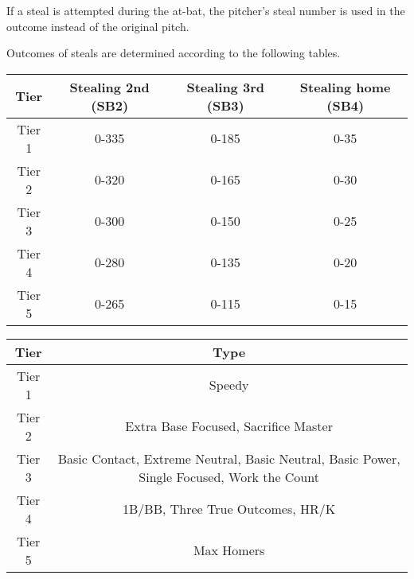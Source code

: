 \begin{deepEnumerate}
\begin{deepEnumerate}
\begin{deepEnumerate}
			If a steal is attempted during the at-bat, the pitcher's steal number is used in the outcome instead of the original pitch. 
		\end{deepEnumerate}
		\item Outcomes of steals are determined according to the following tables.
		\begin{center}
			\begin{tabular}{|c|c|c|c|}
				\hline
				\textbf{Tier} & \textbf{Stealing 2nd} (SB2)    & \textbf{Stealing 3rd} (SB3)    & \textbf{Stealing home} (SB4) \\
				\hline 
				Tier 1   	  & 0-335                          & 0-185                          & 0-35                         \\
				\hline
				Tier 2    	  & 0-320                          & 0-165                          & 0-30                         \\
				\hline
				Tier 3   	  & 0-300                          & 0-150                          & 0-25                         \\
				\hline
				Tier 4   	  & 0-280                          & 0-135                          & 0-20                         \\
				\hline
				Tier 5   	  & 0-265                          & 0-115                          & 0-15                         \\
				\hline
			\end{tabular}
			\begin{tabular}{|c|c|}
				\hline
				\textbf{Tier} & \textbf{Type}                                           		\\
				\hline 
				Tier 1   	 & Speedy \\
				\hline
				Tier 2    	 & Extra Base Focused, Sacrifice Master\\
				\hline
				Tier 3   	 &Basic Contact, Extreme Neutral, Basic Neutral, Basic Power, Single Focused, Work the Count \\
				\hline
				Tier 4   	 & 1B/BB, Three True Outcomes, HR/K \\
				\hline
				Tier 5   	 & Max Homers \\
				\hline
			\end{tabular}
			

\end{center}
\end{deepEnumerate}
\end{deepEnumerate}
